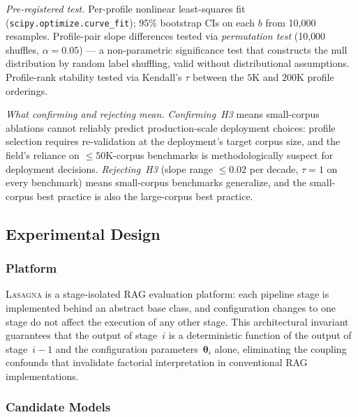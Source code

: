 \textit{Pre-registered test.} Per-profile nonlinear least-squares
fit (\texttt{scipy.optimize.curve\_fit}); 95\% bootstrap CIs on each
$b$ from 10{,}000 resamples.  Profile-pair slope differences tested
via \emph{permutation test} (10{,}000 shuffles, $\alpha = 0.05$) ---
a non-parametric significance test that constructs the null
distribution by random label shuffling, valid without distributional
assumptions.  Profile-rank stability tested via Kendall's $\tau$
between the $5$K and $200$K profile orderings.

\textit{What confirming and rejecting mean.} \emph{Confirming~H3}
means small-corpus ablations cannot reliably predict production-scale
deployment choices: profile selection requires re-validation at the
deployment's target corpus size, and the field's reliance on
$\leq 50$K-corpus benchmarks is methodologically suspect for
deployment decisions.  \emph{Rejecting~H3} (slope range $\leq 0.02$
per decade, $\tau = 1$ on every benchmark) means small-corpus
benchmarks generalize, and the small-corpus best practice is also the
large-corpus best practice.

\subsection{Experimental Design}
\label{prereg:sec:design}

\subsubsection{Platform}

\textsc{Lasagna} is a stage-isolated RAG evaluation platform: each
pipeline stage is implemented behind an abstract base class, and
configuration changes to one stage do not affect the execution of any
other stage.  This architectural invariant guarantees that the output
of stage~$i$ is a deterministic function of the output of stage~$i{-}1$
and the configuration parameters~$\boldsymbol{\theta}_i$ alone,
eliminating the coupling confounds that invalidate factorial
interpretation in conventional RAG implementations.

\subsubsection{Candidate Models}
\label{prereg:sec:models}

